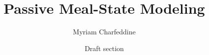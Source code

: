 \documentclass[10pt]{article}
\title{Passive Meal-State Modeling}
\author{Myriam Charfeddine}
\date{Draft section}
\begin{document}
\maketitle

{\small}
\end{document}
